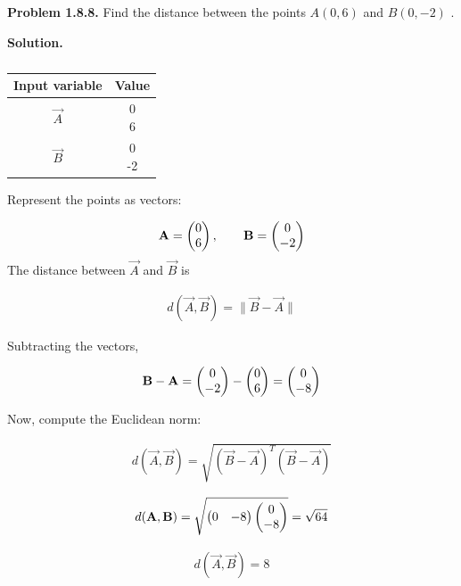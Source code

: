 \documentclass[12pt]{article}
\begin{document}
\textbf{Problem 1.8.8.}  
Find the distance between the points $A(0,6)$ and $B(0,-2)$ .



\textbf{Solution.}

\begin{table}[H]
\centering
\begin{tabular}[12pt]{ |c| c|}
    \hline
    \textbf{Input variable} & \textbf{Value}\\ 
    \hline
    $\vec{A}$ & \myvec{0 \\6 } \\
    \hline 
    $\vec{B}$ & \myvec{0 \\ -2}\\
    \hline
    \end{tabular}
    \caption{
    \label{}
    }
 \end{table}

Represent the points as vectors:

\begin{align}
 \mathbf{A}= \begin{pmatrix}0 \\ 6\end{pmatrix}, \qquad \mathbf{B} = \begin{pmatrix}0 \\ -2\end{pmatrix} 
\end{align}
The distance between $\vec{A}$ and $\vec{B}$ is


\begin{align}
d(\vec{A},\vec{B}) = \|\vec{B} - \vec{A}\| 
\end{align}

Subtracting the vectors,

\begin{align}
\mathbf{B} - \mathbf{A} = \begin{pmatrix}0 \\ -2\end{pmatrix} - \begin{pmatrix}0 \\ 6\end{pmatrix} = \begin{pmatrix}0 \\ -8\end{pmatrix}
\end{align}


Now, compute the Euclidean norm:

\begin{align}
d(\vec{A},\vec{B}) = \sqrt{(\vec{B}-\vec{A})^T(\vec{B}-\vec{A})}
\end{align}



\begin{align}
d(\mathbf{A},\mathbf{B}) = \sqrt{\begin{pmatrix}0 & -8\end{pmatrix}\begin{pmatrix}0 \\ -8\end{pmatrix}} = \sqrt{64}
\end{align}


\begin{align}
 d(\vec{A},\vec{B}) = 8 
\end{align}
\end{document}
